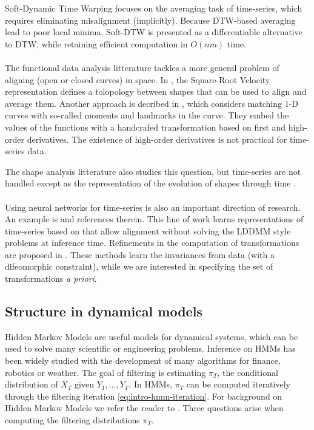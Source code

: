 Soft-Dynamic Time Warping \citep{soft-dtw} focuses on the averaging task of time-series, which requires eliminating misalignment (implicitly). Because DTW-based averaging lead to poor local minima, Soft-DTW is presented as a differentiable alternative to DTW, while retaining efficient computation in $O(nm)$ time.

\paragraph{}
The functional data analysis litterature tackles a more general problem of aligning (open or closed curves) in space. In \cite{srvf}, the Square-Root Velocity representation defines a tolopology between shapes that can be used to align and average them. Another approach is decribed in \cite{curve-moments}, which considers matching 1-D curves with so-called moments and landmarks in the curve. They embed the values of the functions with a handcrafed transformation based on first and high-order derivatives. The existence of high-order derivatives is not practical for time-series data.

The shape analysis litterature also studies this question, but time-series are not handled except as the representation of the evolution of shapes through time \citep{2108.05634,Durrleman2013}.

\paragraph{} Using neural networks for time-series is also an important direction of research. An example is \cite{2106.11911,dtan} and references therein. This line of work learns representations of time-series based on \cite{pavf} that allow alignment without solving the LDDMM style problems at inference time. Refinements in the computation of transformations are proposed in \cite{martinez22a}. These methods learn the invariances from data (with a difeomorphic constraint), while we are interested in specifying the set of transformations \emph{a priori}.

\subsection{Structure in dynamical models}
Hidden Markov Models are useful models for dynamical systems, which can be used to solve many scientific or engineering problems. Inference on HMMs has been widely studied with the development of many algorithms for finance, robotics or weather.\citep{cappehmm} The goal of filtering is estimating $\pi_T$, the conditional distribution of $X_T$ given $Y_1, \ldots, Y_T$. In HMMs, $\pi_T$ can be computed iteratively through the filtering iteration \cref{eq:intro-hmm-iteration}. For background on Hidden Markov Models we refer the reader to \cite{cappehmm}. Three questions arise when computing the filtering distributions $\pi_T$.

